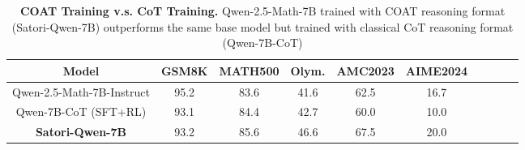 \begin{table}[h]
  \begin{center}
  \scriptsize
  \captionsetup{font=small}
  \caption{\textbf{COAT Training v.s. CoT Training.} Qwen-2.5-Math-7B trained with COAT reasoning format (Satori-Qwen-7B) outperforms the same base model but trained with classical CoT reasoning format (Qwen-7B-CoT)}
  \setlength{\tabcolsep}{1.3pt}
  \begin{tabular}{cccccccccc}
    \toprule
    \textbf{Model} & \textbf{GSM8K} & \textbf{MATH500}  &  \textbf{Olym.} & \textbf{AMC2023} & \textbf{AIME2024} \\
    \midrule
    Qwen-2.5-Math-7B-Instruct & 95.2 & 83.6 &41.6& 62.5 &16.7 \\
    Qwen-7B-CoT (SFT+RL) & 93.1 & 84.4  &	42.7 &	60.0 & 10.0 \\
    \midrule
    \textbf{Satori-Qwen-7B}  & 93.2 & 85.6  & 46.6  & 67.5  & 20.0 \\
    \bottomrule
  \end{tabular}
  \label{table:ablation-coat}
  \end{center}
\vspace{-1em}
\end{table}